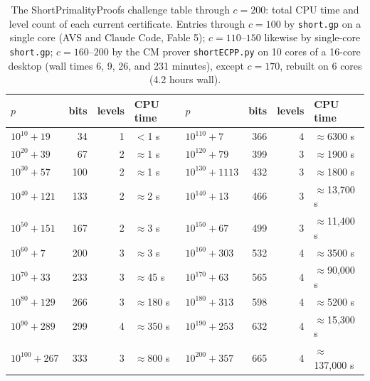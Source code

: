 \documentclass[11pt]{amsart}
\newcommand{\osf}{\cite{OSF}}
\theoremstyle{plain}
\theoremstyle{definition}
\theoremstyle{remark}
\begin{document}
\begin{table}[htbp]
\centering\footnotesize
\begin{tabular}{@{}lrrl@{\qquad}lrrl@{}}
\toprule
$p$ & bits & levels & CPU time & $p$ & bits & levels & CPU time\\
\midrule
$10^{10}+19$  & 34  & 1 & ${<}$1 s        & $10^{110}+7$    & 366 & 4 & ${\approx}$6300 s\\
$10^{20}+39$  & 67  & 2 & ${\approx}$1 s  & $10^{120}+79$   & 399 & 3 & ${\approx}$1900 s\\
$10^{30}+57$  & 100 & 2 & ${\approx}$1 s  & $10^{130}+1113$ & 432 & 3 & ${\approx}$1800 s\\
$10^{40}+121$ & 133 & 2 & ${\approx}$2 s  & $10^{140}+13$   & 466 & 3 & ${\approx}$13{,}700 s\\
$10^{50}+151$ & 167 & 2 & ${\approx}$3 s  & $10^{150}+67$   & 499 & 3 & ${\approx}$11{,}400 s\\
$10^{60}+7$   & 200 & 3 & ${\approx}$3 s  & $10^{160}+303$  & 532 & 4 & ${\approx}$3500 s\\
$10^{70}+33$  & 233 & 3 & ${\approx}$45 s & $10^{170}+63$   & 565 & 4 & ${\approx}$90{,}000 s\\
$10^{80}+129$ & 266 & 3 & ${\approx}$180 s& $10^{180}+313$  & 598 & 4 & ${\approx}$5200 s\\
$10^{90}+289$ & 299 & 4 & ${\approx}$350 s& $10^{190}+253$  & 632 & 4 & ${\approx}$15{,}300 s\\
$10^{100}+267$& 333 & 3 & ${\approx}$800 s& $10^{200}+357$  & 665 & 4 & ${\approx}$137{,}000 s\\
\bottomrule
\end{tabular}
\medskip
\caption{The ShortPrimalityProofs challenge table \cite{Short} through $c = 200$: total CPU time
and level count of each current certificate.  Entries through $c = 100$ by \texttt{short.gp} on a
single core (AVS and Claude Code, Fable 5); $c = 110$--$150$ likewise by single-core
\texttt{short.gp}; $c = 160$--$200$ by the CM prover \texttt{shortECPP.py} \osf{} on 10 cores of a
16-core desktop (wall times 6, 9, 26, and 231 minutes), except $c = 170$, rebuilt on 6 cores
(4.2 hours wall).}
\label{tab:shortresults}
\end{table}
\end{document}
